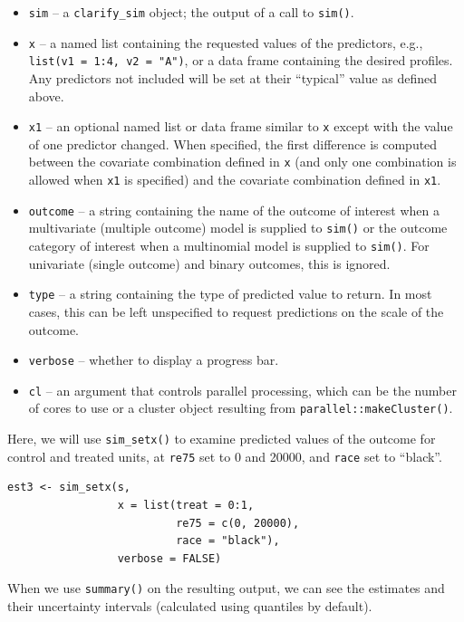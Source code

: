 \begin{itemize}
\item
  \texttt{sim} -- a \texttt{clarify\_sim} object; the output of a call to \texttt{sim()}.
\item
  \texttt{x} -- a named list containing the requested values of the predictors, e.g., \texttt{list(v1\ =\ 1:4,\ v2\ =\ "A")}, or a data frame containing the desired profiles. Any predictors not included will be set at their ``typical'' value as defined above.
\item
  \texttt{x1} -- an optional named list or data frame similar to \texttt{x} except with the value of one predictor changed. When specified, the first difference is computed between the covariate combination defined in \texttt{x} (and only one combination is allowed when \texttt{x1} is specified) and the covariate combination defined in \texttt{x1}.
\item
  \texttt{outcome} -- a string containing the name of the outcome of interest when a multivariate (multiple outcome) model is supplied to \texttt{sim()} or the outcome category of interest when a multinomial model is supplied to \texttt{sim()}. For univariate (single outcome) and binary outcomes, this is ignored.
\item
  \texttt{type} -- a string containing the type of predicted value to return. In most cases, this can be left unspecified to request predictions on the scale of the outcome.
\item
  \texttt{verbose} -- whether to display a progress bar.
\item
  \texttt{cl} -- an argument that controls parallel processing, which can be the number of cores to use or a cluster object resulting from \texttt{parallel::makeCluster()}.
\end{itemize}

Here, we will use \texttt{sim\_setx()} to examine predicted values of the outcome for control and treated units, at \texttt{re75} set to 0 and 20000, and \texttt{race} set to ``black''.

\begin{verbatim}
est3 <- sim_setx(s,
                 x = list(treat = 0:1,
                          re75 = c(0, 20000),
                          race = "black"),
                 verbose = FALSE)
\end{verbatim}

When we use \texttt{summary()} on the resulting output, we can see the estimates and their uncertainty intervals (calculated using quantiles by default).

